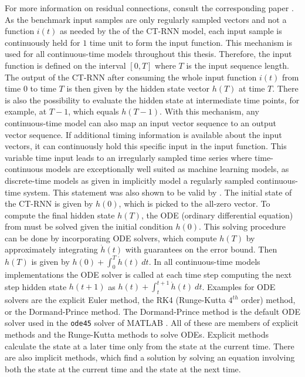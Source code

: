 \documentclass[draft,final]{vutinfth} %
\begin{document}
    For more information on residual connections, consult the corresponding paper \cite{ResNet}.
    As the benchmark input samples are only regularly sampled vectors and not a function $i(t)$ as needed by the  of the CT-RNN model, each input sample is continuously held for $1$ time unit to form the input function.
    This mechanism is used for all continuous-time models throughout this thesis.
    Therefore, the input function is defined on the interval $[0, T]$ where $T$ is the input sequence length.
    The output of the CT-RNN after consuming the whole input function $i(t)$ from time $0$ to time $T$ is then given by the hidden state vector $h(T)$ at time $T$.
    There is also the possibility to evaluate the hidden state at intermediate time points, for example, at $T-1$, which equals $h(T-1)$.
    With this mechanism, any continuous-time model can also map an input vector sequence to an output vector sequence.
    If additional timing information is available about the input vectors, it can continuously hold this specific input in the input function.
    This variable time input leads to an irregularly sampled time series where time-continuous models are exceptionally well suited as machine learning models, as discrete-time models as given in  implicitly model a regularly sampled continuous-time system.
    This statement was also shown to be valid by \cite{ODELSTM}.
    The initial state of the CT-RNN is given by $h(0)$, which is picked to the all-zero vector.
    To compute the final hidden state $h(T)$, the ODE (ordinary differential equation) from  must be solved given the initial condition $h(0)$.
    This solving procedure can be done by incorporating ODE solvers, which compute $h(T)$ by approximately integrating $\dot h(t)$ with guarantees on the error bound.
    Then $h(T)$ is given by $h(0) + \int_0^T{\dot h(t)}~dt$.
    In all continuous-time models implementations the ODE solver is called at each time step computing the next step hidden state $h(t+1)$ as $h(t) + \int_t^{t+1}{\dot h(t)}~dt$.
    Examples for ODE solvers are the explicit Euler method, the RK4 (Runge-Kutta $4^{th}$ order) method, or the Dormand-Prince method.
    The Dormand-Prince method is the default ODE solver used in the \texttt{ode45} solver of MATLAB \cite{MATLAB}.
    All of these are members of explicit methods and the Runge-Kutta methods to solve ODEs. Explicit methods calculate the state at a later time only from the state at the current time.
    There are also implicit methods, which find a solution by solving an equation involving both the state at the current time and the state at the next time.
\end{document}
